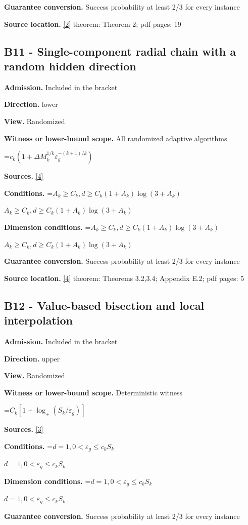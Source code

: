 \documentclass[10pt,a4paper]{article}
\newcommand{\AtlasMath}[1]{\par\begingroup\centering\setbox0=\hbox{$\displaystyle #1$}\ifdim\wd0>1.4\linewidth\typeout{ATLAS WIDE FORMULA: \the\wd0}\fi\ifdim\wd0>\linewidth\resizebox{\linewidth}{!}{\box0}\else\box0\fi\par\endgroup}
\newcommand{\AtlasInlineMath}[1]{\begingroup\setbox0=\hbox{$#1$}\ifdim\wd0>.4\linewidth\endgroup\AtlasMath{#1}\else\endgroup$#1$\fi}
\begin{document}
\textbf{Guarantee conversion.} Success probability at least 2/3 for every instance

\textbf{Source location.} \href{https://arxiv.org/abs/1710.11606}{[2]} theorem: Theorem 2; pdf pages: 19

\subsection{B11 - Single-component radial chain with a random hidden direction}
\textbf{Admission.} Included in the bracket

\textbf{Direction.} lower

\textbf{View.} Randomized

\textbf{Witness or lower-bound scope.} All randomized adaptive algorithms

\AtlasMath{c_k(1+\Delta M_k^{1/k}\varepsilon_g^{-(k+1)/k})}
\textbf{Sources.} \href{https://arxiv.org/abs/2609.28202}{[4]}

\textbf{Conditions.} \AtlasInlineMath{A_k\ge C_k, d\ge C_k(1+A_k)\log(3+A_k)}

\textbf{Dimension conditions.} \AtlasInlineMath{A_k\ge C_k, d\ge C_k(1+A_k)\log(3+A_k)}

\textbf{Guarantee conversion.} Success probability at least 2/3 for every instance

\textbf{Source location.} \href{https://arxiv.org/abs/2609.28202}{[4]} theorem: Theorems 3.2,3.4; Appendix E.2; pdf pages: 5

\subsection{B12 - Value-based bisection and local interpolation}
\textbf{Admission.} Included in the bracket

\textbf{Direction.} upper

\textbf{View.} Randomized

\textbf{Witness or lower-bound scope.} Deterministic witness

\AtlasMath{C_k[1+\log_+(S_k/\varepsilon_g)]}
\textbf{Sources.} \href{https://arxiv.org/abs/2610.16295}{[3]}

\textbf{Conditions.} \AtlasInlineMath{d=1, 0<\varepsilon_g\le c_k S_k}

\textbf{Dimension conditions.} \AtlasInlineMath{d=1, 0<\varepsilon_g\le c_k S_k}

\textbf{Guarantee conversion.} Success probability at least 2/3 for every instance
\end{document}
